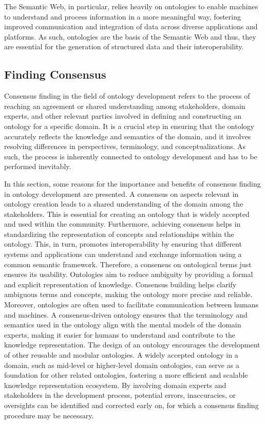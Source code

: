 The Semantic Web, in particular, relies heavily on ontologies to enable machines to understand and process information in a more meaningful way, fostering improved communication and integration of data across diverse applications and platforms. As such, ontologies are the basis of the Semantic Web and thus, they are essential for the generation of structured data and their interoperability.


\subsection{Finding Consensus}

Consensus finding in the field of ontology development refers to the process of reaching an agreement or shared understanding among stakeholders, domain experts, and other relevant parties involved in defining and constructing an ontology for a specific domain. It is a crucial step in ensuring that the ontology accurately reflects the knowledge and semantics of the domain, and it involves resolving differences in perspectives, terminology, and conceptualizations. As such, the process is inherently connected to ontology development and has to be performed inevitably.

In this section, some reasons for the importance and benefits of consensus finding in ontology development are presented.
A consensus on aspects relevant in ontology creation leads to a shared understanding of the domain among the stakeholders. This is essential for creating an ontology that is widely accepted and used within the community. Furthermore, achieving consensus helps in standardizing the representation of concepts and relationships within the ontology. This, in turn, promotes interoperability by ensuring that different systems and applications can understand and exchange information using a common semantic framework. Therefore, a consensus on ontological terms just ensures its usability. Ontologies aim to reduce ambiguity by providing a formal and explicit representation of knowledge. Consensus building helps clarify ambiguous terms and concepts, making the ontology more precise and reliable. Moreover, ontologies are often used to facilitate communication between humans and machines. A consensus-driven ontology ensures that the terminology and semantics used in the ontology align with the mental models of the domain experts, making it easier for humans to understand and contribute to the knowledge representation.
The design of an ontology encourages the development of other reusable and modular ontologies. A widely accepted ontology in a domain, such as mid-level or higher-level domain ontologies, can serve as a foundation for other related ontologies, fostering a more efficient and scalable knowledge representation ecosystem. By involving domain experts and stakeholders in the development process, potential errors, inaccuracies, or oversights can be identified and corrected early on, for which a consensus finding procedure may be necessary.

